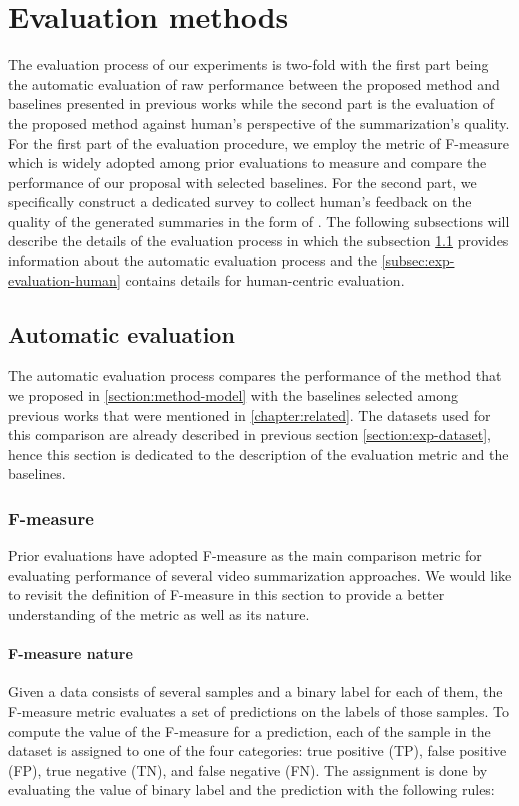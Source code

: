 \section{Evaluation methods}
\label{section:exp-evaluation}

The evaluation process of our experiments is two-fold with the first part being the automatic evaluation of raw performance between the proposed method and baselines presented in previous works while the second part is the evaluation of the proposed method against human's perspective of the summarization's quality. For the first part of the evaluation procedure, we employ the metric of F-measure which is widely adopted among prior evaluations to measure and compare the performance of our proposal with selected baselines. For the second part, we specifically construct a dedicated survey to collect human's feedback on the quality of the generated summaries in the form of . The following subsections will describe the details of the evaluation process in which the subsection \ref{subsec:exp-evaluation-automatic} provides information about the automatic evaluation process and the \ref{subsec:exp-evaluation-human} contains details for human-centric evaluation.

\subsection{Automatic evaluation}
\label{subsec:exp-evaluation-automatic}
    The automatic evaluation process compares the performance of the method that we proposed in \ref{section:method-model} with the baselines selected among previous works that were mentioned in \ref{chapter:related}. The datasets used for this comparison are already described in previous section \ref{section:exp-dataset}, hence this section is dedicated to the description of the evaluation metric and the baselines.

    \subsubsection{F-measure}
    \label{subsubsec:exp-evaluation-automatic-fmeasure}
        Prior evaluations have adopted F-measure as the main comparison metric for evaluating performance of several video summarization approaches. We would like to revisit the definition of F-measure in this section to provide a better understanding of the metric as well as its nature.

        \paragraph[long]{F-measure nature}
            Given a data consists of several samples and a binary label for each of them, the F-measure metric evaluates a set of predictions on the labels of those samples. To compute the value of the F-measure for a prediction, each of the sample in the dataset is assigned to one of the four categories: true positive (TP), false positive (FP), true negative (TN), and false negative (FN). The assignment is done by evaluating the value of binary label and the prediction with the following rules:
            
